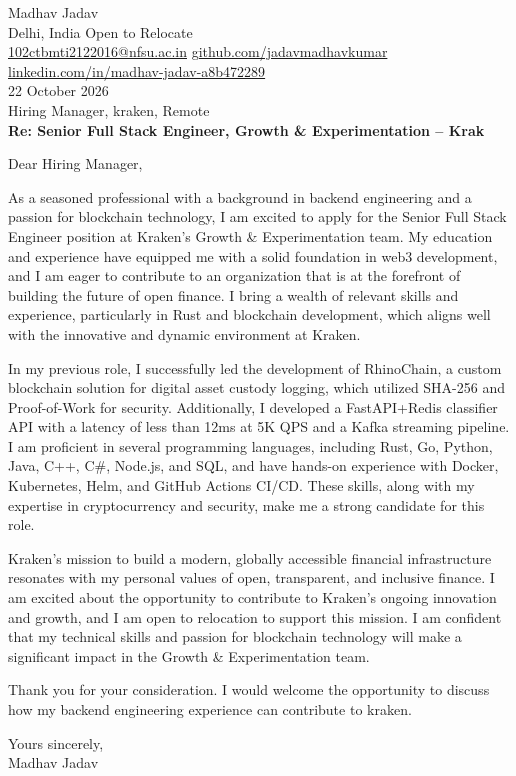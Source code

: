 \documentclass[10pt,letterpaper]{article}
\begin{document}
\begin{flushleft}
Madhav Jadav\\
Delhi, India \textbar{} Open to Relocate\\
\href{mailto:102ctbmti2122016@nfsu.ac.in}{102ctbmti2122016@nfsu.ac.in} \textbar{} \href{https://github.com/jadavmadhavkumar}{github.com/jadavmadhavkumar} \textbar{} \href{https://www.linkedin.com/in/madhav-jadav-a8b472289}{linkedin.com/in/madhav-jadav-a8b472289}\\[8pt]
22 October 2026\\[4pt]
Hiring Manager, kraken, Remote\\[8pt]
\textbf{Re: Senior Full Stack Engineer, Growth \& Experimentation – Krak}\\[8pt]
\end{flushleft}
Dear Hiring Manager,

As a seasoned professional with a background in backend engineering and a passion for blockchain technology, I am excited to apply for the Senior Full Stack Engineer position at Kraken's Growth \& Experimentation team. My education and experience have equipped me with a solid foundation in web3 development, and I am eager to contribute to an organization that is at the forefront of building the future of open finance. I bring a wealth of relevant skills and experience, particularly in Rust and blockchain development, which aligns well with the innovative and dynamic environment at Kraken.

In my previous role, I successfully led the development of RhinoChain, a custom blockchain solution for digital asset custody logging, which utilized SHA-256 and Proof-of-Work for security. Additionally, I developed a FastAPI+Redis classifier API with a latency of less than 12ms at 5K QPS and a Kafka streaming pipeline. I am proficient in several programming languages, including Rust, Go, Python, Java, C++, C\#, Node.js, and SQL, and have hands-on experience with Docker, Kubernetes, Helm, and GitHub Actions CI/CD. These skills, along with my expertise in cryptocurrency and security, make me a strong candidate for this role.

Kraken's mission to build a modern, globally accessible financial infrastructure resonates with my personal values of open, transparent, and inclusive finance. I am excited about the opportunity to contribute to Kraken's ongoing innovation and growth, and I am open to relocation to support this mission. I am confident that my technical skills and passion for blockchain technology will make a significant impact in the Growth \& Experimentation team.

Thank you for your consideration. I would welcome the opportunity to discuss how my backend engineering experience can contribute to kraken.

Yours sincerely,\\[8pt]
Madhav Jadav
\end{document}
